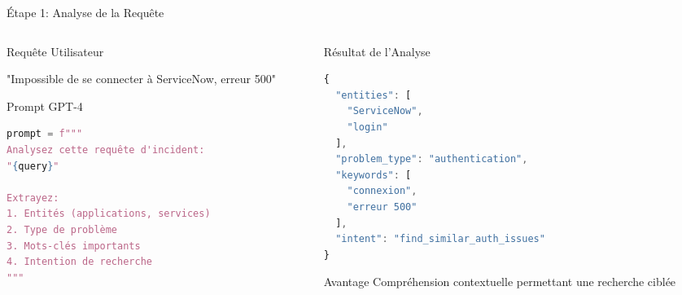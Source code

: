\documentclass[10pt, aspectratio=169]{beamer}
\begin{document}
\begin{frame}[fragile]{Étape 1: Analyse de la Requête}
    \begin{columns}[T]
        \begin{column}{0.5\textwidth}
            \begin{block}{Requête Utilisateur}
                \begin{tcolorbox}[colback=blue!5!white,colframe=blue!75!black]
                    \footnotesize
                    "Impossible de se connecter à ServiceNow, erreur 500"
                \end{tcolorbox}
            \end{block}
            
            \begin{block}{Prompt GPT-4}
                \begin{lstlisting}[language=Python, basicstyle=\tiny\ttfamily]
prompt = f"""
Analysez cette requête d'incident:
"{query}"

Extrayez:
1. Entités (applications, services)
2. Type de problème
3. Mots-clés importants
4. Intention de recherche
"""
                \end{lstlisting}
            \end{block}
        \end{column}
        
        \begin{column}{0.5\textwidth}
            \begin{block}{Résultat de l'Analyse}
                \begin{lstlisting}[language=JavaScript, basicstyle=\tiny\ttfamily]
{
  "entities": [
    "ServiceNow", 
    "login"
  ],
  "problem_type": "authentication",
  "keywords": [
    "connexion", 
    "erreur 500"
  ],
  "intent": "find_similar_auth_issues"
}
                \end{lstlisting}
            \end{block}
            
            \begin{alertblock}{Avantage}
                \footnotesize
                Compréhension contextuelle permettant une recherche ciblée
            \end{alertblock}
        \end{column}
    \end{columns}
\end{frame}
\end{document}
